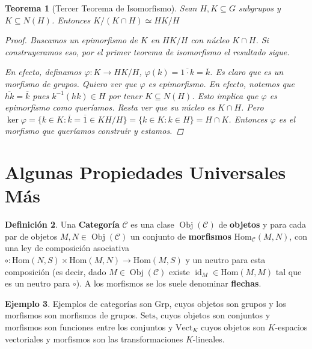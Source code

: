 \documentclass[12pt]{book}
\newtheorem{teo}{Teorema}[section]
\theoremstyle{definition}
\newtheorem{defn}[teo]{Definición}
\newtheorem{ex}[teo]{Ejemplo}
\renewcommand{\hom}{\mathrm{Hom}}
\DeclareMathOperator{\id}{id}
\DeclareMathOperator{\Obj}{Obj}
\begin{document}
\begin{teo}[Tercer Teorema de Isomorfismo]
Sean $H,K\subseteq G$ subgrupos y $K\subseteq N(H)$. Entonces $K/(K\cap H)\simeq HK/H$
\begin{proof}
Buscamos un epimorfismo de $K$ en $HK/H$ con núcleo $K\cap H$. Si construyeramos eso, por el primer teorema de isomorfismo el resultado sigue.

En efecto, definamos $\varphi : K\to HK/H$, $\varphi (k) = \overline{1\cdot k} = \overline{k}$. Es claro que es un morfismo de grupos. Quiero ver que $\varphi$ es epimorfismo. En efecto, notemos que $\overline{hk} = \overline{k}$ pues $k^{-1} (hk)\in H$ por tener $K\subseteq N(H)$. Esto implica que $\varphi$ es epimorfismo como queríamos. Resta ver que su núcleo es $K\cap H$. Pero $\ker \varphi = \{k\in K : \overline{k} = \overline{1} \in KH/H\} = \{k\in K : k\in H\} = H\cap K$. Entonces $\varphi$ es el morfismo que queríamos construir y estamos.

\end{proof}
\end{teo}
\newpage 

\section{Algunas Propiedades Universales Más}

\begin{defn}
Una \textbf{Categoría} $\mathcal{C}$ es una clase $\Obj(\mathcal{C})$ de \textbf{objetos} y para cada par de objetos $M,N\in\Obj(\mathcal{C})$ un conjunto de \textbf{morfismos} $\hom_{\mathcal{C}}(M,N)$, con una ley de composición asociativa $\circ:\hom(N,S)\times \hom(M,N)\to \hom(M,S)$ y un neutro para esta composición (es decir, dado $M\in\Obj(\mathcal{C})$ existe $\id_M\in\hom(M,M)$ tal que es un neutro para $\circ$). A los morfismos se los suele denominar \textbf{flechas}.
\end{defn}
\begin{ex}
Ejemplos de categorías son $\text{Grp}$, cuyos objetos son grupos y los morfismos son morfismos de grupos. $\text{Sets}$, cuyos objetos son conjuntos y morfismos son funciones entre los conjuntos y $\text{Vect}_K$ cuyos objetos son $K$-espacios vectoriales y morfismos son las transformaciones $K$-lineales.
\end{ex}
\end{document}
